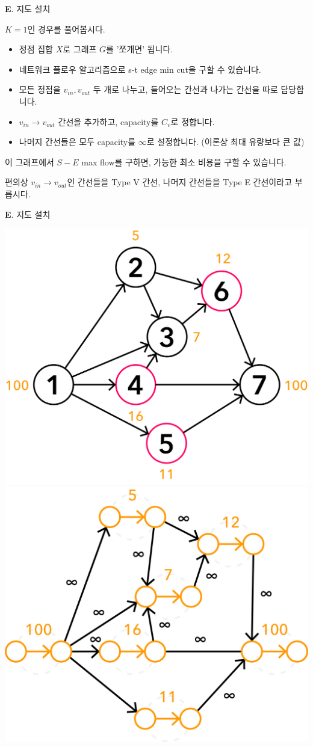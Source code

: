 \begin{frame}{\textbf{E}. 지도 설치}

    $K = 1$인 경우를 풀어봅시다.
    \begin{itemize}
        \item 정점 집합 $X$로 그래프 $G$를 '쪼개면' 됩니다.
        \item 네트워크 플로우 알고리즘으로 s-t edge min cut을 구할 수 있습니다.
        \item 모든 정점을 $v_{in}, v_{out}$ 두 개로 나누고, 들어오는 간선과 나가는 간선을 따로 담당합니다.
        \item $v_{in} \rightarrow v_{out}$ 간선을 추가하고, capacity를 $C_v$로 정합니다.
        \item 나머지 간선들은 모두 capacity를 $\infty$로 설정합니다. (이론상 최대 유량보다 큰 값)
    \end{itemize}
    
    이 그래프에서 $S - E$ max flow를 구하면, 가능한 최소 비용을 구할 수 있습니다.
    
    \vspace{0.5 \baselineskip}
    
    편의상 $v_{in} \rightarrow v_{out}$인 간선들을 Type V 간선, 나머지 간선들을 Type E 간선이라고 부릅시다.

\end{frame}


\begin{frame}{\textbf{E}. 지도 설치}

    \begin{center}
        \includegraphics[width=0.45\linewidth]{../images/setting-maps/maps_ex_1.png}
        \hspace{0.05\linewidth}
        \includegraphics[width=0.45\linewidth]{../images/setting-maps/maps_sol_1.png}
    \end{center}

\end{frame}


